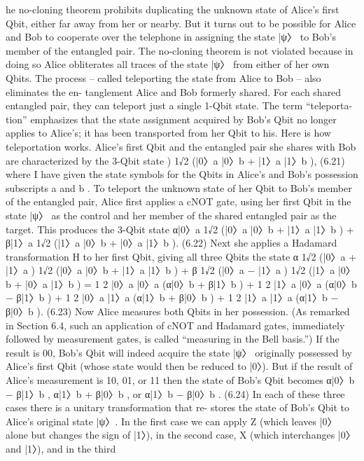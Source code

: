 \documentclass{book}
\begin{document}
he no-cloning theorem prohibits duplicating the unknown state
of Alice’s first Qbit, either far away from her or nearby. But it turns
out to be possible for Alice and Bob to cooperate over the telephone
in assigning the state |ψ〉 to Bob’s member of the entangled pair. The
no-cloning theorem is not violated because in doing so Alice obliterates
all traces of the state |ψ〉 from either of her own Qbits. The process –
called teleporting the state from Alice to Bob – also eliminates the en-
tanglement Alice and Bob formerly shared. For each shared entangled
pair, they can teleport just a single 1-Qbit state. The term “teleporta-
tion” emphasizes that the state assignment acquired by Bob’s Qbit no
longer applies to Alice’s; it has been transported from her Qbit to his.
Here is how teleportation works. Alice’s first Qbit and the entangled
pair she shares with Bob are characterized by the 3-Qbit state
) 1√2
(|0〉a |0〉b + |1〉a |1〉b
), (6.21)
where I have given the state symbols for the Qbits in Alice’s and Bob’s
possession subscripts a and b . To teleport the unknown state of her
Qbit to Bob’s member of the entangled pair, Alice first applies a cNOT
gate, using her first Qbit in the state |ψ〉 as the control and her member
of the shared entangled pair as the target. This produces the 3-Qbit
state
α|0〉a 1√2
(|0〉a |0〉b + |1〉a |1〉b
) + β|1〉a 1√2
(|1〉a |0〉b + |0〉a |1〉b
).
(6.22)
Next she applies a Hadamard transformation H to her first Qbit, giving
all three Qbits the state
α 1√2
(|0〉a + |1〉a
) 1√2
(|0〉a |0〉b + |1〉a |1〉b
)
+ β 1√2
(|0〉a − |1〉a
) 1√2
(|1〉a |0〉b + |0〉a |1〉b
)
= 1
2 |0〉a |0〉a
(α|0〉b + β|1〉b
) + 1
2 |1〉a |0〉a
(α|0〉b − β|1〉b
)
+ 1
2 |0〉a |1〉a
(α|1〉b + β|0〉b
) + 1
2 |1〉a |1〉a
(α|1〉b − β|0〉b
). (6.23)
Now Alice measures both Qbits in her possession. (As remarked
in Section 6.4, such an application of cNOT and Hadamard gates,
immediately followed by measurement gates, is called “measuring in
the Bell basis.”) If the result is 00, Bob’s Qbit will indeed acquire the
state |ψ〉 originally possessed by Alice’s first Qbit (whose state would
then be reduced to |0〉). But if the result of Alice’s measurement is 10,
01, or 11 then the state of Bob’s Qbit becomes
α|0〉b − β|1〉b , α|1〉b + β|0〉b , or α|1〉b − β|0〉b . (6.24)
In each of these three cases there is a unitary transformation that re-
stores the state of Bob’s Qbit to Alice’s original state |ψ〉. In the first
case we can apply Z (which leaves |0〉 alone but changes the sign of |1〉),
in the second case, X (which interchanges |0〉 and |1〉), and in the third
\end{document}
